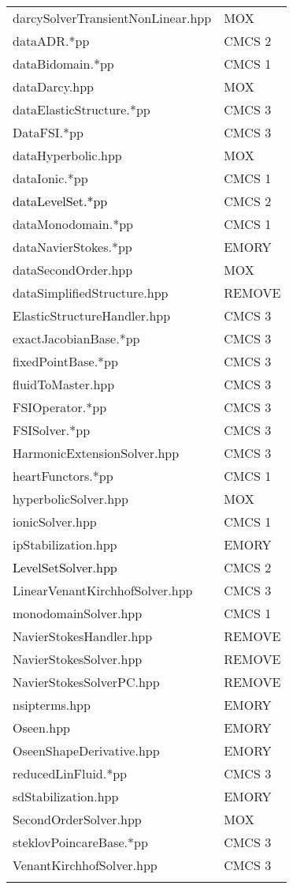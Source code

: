 \documentclass[10p]{article}
\newcommand{\newparts}[1]{\textcolor{black}{#1}}
\theoremstyle{definition}
\begin{document}
\begin{landscape}
\begin{table}[!h]
\begin{multicols}{4}
\begin{xtabular}{
p{0.28\textwidth}<{}|
p{0.1\textwidth}<{}
}
darcySolverTransientNonLinear.hpp & MOX\\
dataADR.*pp & CMCS 2\\
dataBidomain.*pp & CMCS 1\\
dataDarcy.hpp & MOX\\
dataElasticStructure.*pp & CMCS 3\\
DataFSI.*pp & CMCS 3\\
dataHyperbolic.hpp & MOX\\
dataIonic.*pp & CMCS 1\\
\newparts{dataLevelSet.*pp} & CMCS 2\\
dataMonodomain.*pp & CMCS 1\\
dataNavierStokes.*pp & EMORY\\
dataSecondOrder.hpp & MOX\\
dataSimplifiedStructure.hpp & REMOVE\\
ElasticStructureHandler.hpp & CMCS 3\\
exactJacobianBase.*pp & CMCS 3\\
fixedPointBase.*pp & CMCS 3\\
fluidToMaster.hpp & CMCS 3\\
FSIOperator.*pp & CMCS 3\\
FSISolver.*pp & CMCS 3\\
HarmonicExtensionSolver.hpp & CMCS 3\\
heartFunctors.*pp & CMCS 1\\
hyperbolicSolver.hpp & MOX\\
ionicSolver.hpp & CMCS 1\\
ipStabilization.hpp & EMORY\\
\newparts{LevelSetSolver.hpp} & CMCS 2\\
LinearVenantKirchhofSolver.hpp & CMCS 3\\
monodomainSolver.hpp & CMCS 1\\
NavierStokesHandler.hpp & REMOVE\\
NavierStokesSolver.hpp & REMOVE\\
NavierStokesSolverPC.hpp & REMOVE\\
nsipterms.hpp & EMORY\\
Oseen.hpp & EMORY\\
OseenShapeDerivative.hpp & EMORY\\
reducedLinFluid.*pp & CMCS 3\\
sdStabilization.hpp & EMORY\\
SecondOrderSolver.hpp & MOX\\
steklovPoincareBase.*pp & CMCS 3\\
VenantKirchhofSolver.hpp & CMCS 3\\
& \\
\end{xtabular}

\end{multicols}
\normalsize\selectfont
\end{table}
\end{landscape}
\end{document}

